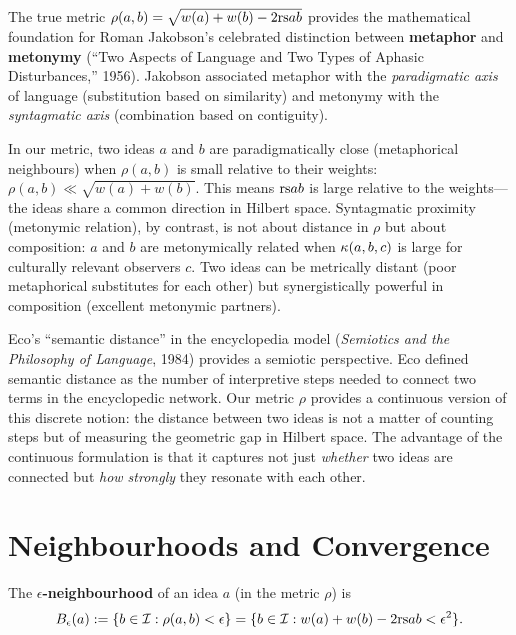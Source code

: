 \begin{interpretation}
\label{interp:ch11:jakobson_metaphor_metonymy}
The true metric $\rho(a,b) = \sqrt{w(a) + w(b) - 2\mathrm{rs}{a}{b}}$ provides
the mathematical foundation for Roman Jakobson's celebrated distinction
between \textbf{metaphor} and \textbf{metonymy} (``Two Aspects of Language
and Two Types of Aphasic Disturbances,'' 1956).  Jakobson associated
metaphor with the \emph{paradigmatic axis} of language (substitution based
on similarity) and metonymy with the \emph{syntagmatic axis} (combination
based on contiguity).

In our metric, two ideas $a$ and $b$ are paradigmatically close (metaphorical
neighbours) when $\rho(a,b)$ is small relative to their weights:
$\rho(a,b) \ll \sqrt{w(a) + w(b)}$.  This means $\mathrm{rs}{a}{b}$ is large
relative to the weights---the ideas share a common direction in Hilbert
space.  Syntagmatic proximity (metonymic relation), by contrast, is not
about distance in $\rho$ but about composition: $a$ and $b$ are metonymically
related when $\kappa(a, b, c)$ is large for culturally relevant observers
$c$.  Two ideas can be metrically distant (poor metaphorical substitutes for
each other) but synergistically powerful in composition (excellent metonymic
partners).

Eco's ``semantic distance'' in the encyclopedia model (\emph{Semiotics and
the Philosophy of Language}, 1984) provides a semiotic perspective.  Eco
defined semantic distance as the number of interpretive steps needed to
connect two terms in the encyclopedic network.  Our metric $\rho$ provides
a continuous version of this discrete notion: the distance between two ideas
is not a matter of counting steps but of measuring the geometric gap in
Hilbert space.  The advantage of the continuous formulation is that it
captures not just \emph{whether} two ideas are connected but \emph{how
strongly} they resonate with each other.
\end{interpretation}



\section{Neighbourhoods and Convergence}

\begin{definition}
\label{def:neighbourhood}
The \textbf{$\epsilon$-neighbourhood} of an idea $a$ (in the metric $\rho$) is
\[
  B_{\epsilon}(a) := \{b \in \mathcal{I} : \rho(a, b) < \epsilon\}
  = \{b \in \mathcal{I} : w(a) + w(b) - 2\mathrm{rs}{a}{b} < \epsilon^2\}.
\]
\end{definition}

